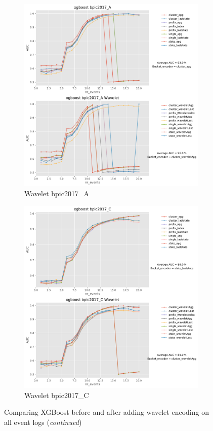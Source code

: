 \begin{figure}[!htbp]
	\begin{subfigure}{0.48\textwidth}
		\includegraphics[width=\linewidth]{images/wavelet/graphs2/bpic2017_A.pdf}
		\caption{Wavelet bpic2017\_A} \label{fig:b17aw}
	\end{subfigure}\hspace*{\fill}
	\begin{subfigure}{0.48\textwidth}
		\includegraphics[width=\linewidth]{images/wavelet/graphs2/bpic2017_C.pdf}
		\caption{Wavelet bpic2017\_C} \label{fig:b17cw}
	\end{subfigure}
	\caption{Comparing XGBoost before and after adding wavelet encoding on all event logs (\textit{continued})}
	\label{fig:r2w}
\end{figure}


